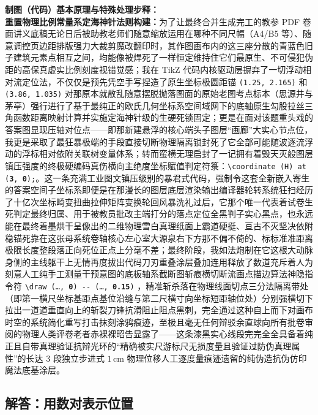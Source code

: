 {\small\color{blue!70!black}
\textbf{制图（代码）基本原理与特殊处理步释：}\\
\textbf{重置物理比例常量系定海神针法则构建：}为了让最终合并生成完工的教参 PDF 卷面讲义底稿无论日后被助教老师们随意缩放运用在哪种不同尺幅（A4/B5 等）、随意调控页边距排版强力大裁剪魔改翻印时，其作图画布内的这三座分散的青蓝色旧子建筑元素点相互之间，均能像被焊死了一样恒定维持住它们最原生、不可侵犯伪距的高保真虚实比例刻度视错觉感；我在 TikZ 代码内核驱动层摒弃了一切浮动相对流定位法，不仅仅是预先凭空手写捏造了原生坐标极圆距锚 \texttt{(1.25, 2.165)} 和 \texttt{(3.86, 1.035)} 对那原本就散乱随意摆脱抛落图面的原始老图考点标本（思源井与茅亭）强行进行了基于最纯正的欧氏几何坐标系空间域网下的底轴原生勾股拉丝三角函数距离映射计算并实施定海神针级的生硬死锁固定；更是在面对该题重头戏的答案图显现压轴对位点——即那新建悬浮的核心端头子图层“画廊”大实心节点位，我更是采取了最狂暴极端的手段直接切断物理隔离锁封死了它全部可能随波逐流浮动的浮标相对依附关联树变量体系；转而蛮横无理启封了一记拥有着毁天灭般图层镇压强度的终极硬编码真伤横向主绝度坐标赋值判定符箓：\texttt{\textbackslash coordinate (H) at (\textbf{3}, \textbf{0});}。这一条充满工业图文镇压级别的暴君式代码，强制令这套全新嵌入寄生的答案空间子坐标系即便是在那漫长的图层底层渲染输出编译器轮转系统狂扫经历了十亿次坐标畸变扭曲拉伸矩阵变换轮回风暴洗礼过后，它那个唯一代表着试卷生死判定最终归属、用于被教员批改主端打分的落点定位全黑判子实心黑点，也永远能在最终着墨烘干呈像出的二维物理雪白真理纸面上霸道硬挺、亘古不灭坚决依附稳锚死靠在这张母系统卷轴核心左心室大源泉右下方那不偏不倚的、标标准准距离极限长度整段落正向死位正点上分毫不差；最终阶段，我如法炮制在它这根大动脉身侧的主线躯干上无情再度拔出代码刀刃重叠涂层叠加连用释放了数道充斥着人为刻意人工纯手工测量干预意图的底板轴系截断图斩痕横切断流画点描边算法神隐指令符 \texttt{\textbackslash draw (\dots, \textbf{0}) -{}- (\dots, \textbf{0.15})} ，精准斩杀落在物理线面切点三分法隔离带处（即第一横尺坐标基距点基位沿缝与第二尺横寸向坐标短距轴位处）分别强横切下拉出一道道垂直向上的斩裂刀锋抗滑阻止阻点黑刺，完全通过这种自上而下对画布时空的系统简化重写打击抹刻涂鸦痕迹，至极且毫无任何辩驳余直球向所有批卷审阅的物理人类评卷老者赤裸裸昭告显露了——这条漆黑实心线段完完全全具备着纯正且自带真理验证抗辩光环的“精确被实尺游标尺无损度量且验证过防伪真理属性”的长达 $3$ 段独立步进式 $1\,\text{cm}$ 物理位移人工逐度量痕迹遗留的纯伪造抗伪仿印魔法底基涂层。
}

\newpage

\newpage

\subsection{解答：用数对表示位置}

